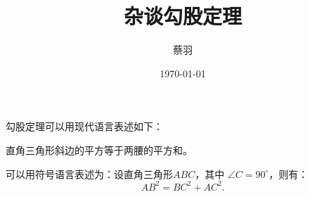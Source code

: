 \documentclass{ctexart}%
\title{\heiti 杂谈勾股定理}	%
\author{\kaishu 蔡羽}
\date{\today}
\newcommand\degree{^\circ}	%
\begin{document}
	\maketitle
	
	勾股定理可以用现代语言表述如下：
	
	直角三角形斜边的平方等于两腰的平方和。
	
	可以用符号语言表述为：设直角三角形$ABC$，其中
	$\angle C=90\degree$，则有：
	\begin{equation}	%
		AB^2 = BC^2 + AC^2.
	\end{equation}
\end{document}
